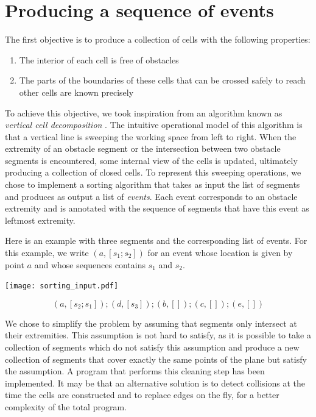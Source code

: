 \documentclass{easychair}
\begin{document}
\section{Producing a sequence of events}
The first objective is to produce a collection of cells with the following
properties:
\begin{enumerate}
\item The interior of each cell is free of obstacles
\item The parts of the boundaries of these cells that can be crossed
  safely to reach other cells are known precisely
\end{enumerate}
To achieve this objective, we took inspiration from an algorithm known as
{\em vertical cell decomposition} \cite{Latombe91}.  The intuitive
operational model of this algorithm is that a vertical line is
sweeping the working space from left to right.  When the extremity of
an obstacle segment or the intersection between two obstacle segments
is encountered, some internal view of the cells is updated, ultimately
producing a collection of closed cells.  To represent this sweeping
operations, we chose to implement a sorting algorithm that takes as
input the list of segments and produces as output a list of {\em
  events}.  Each event corresponds to an obstacle extremity and is
annotated with the sequence of segments that have this event as
leftmost extremity.

Here is an example with three segments and the corresponding list of events.
For this example, we write \((a, [s_1;s_2])\) for an event whose location is
given by point \(a\) and whose sequences contains \(s_1\) and \(s_2\).

\begin{center}
\texttt{[image: sorting\_input.pdf]}
\end{center}
\[ (a, [s_2; s_1]); (d, [s_3]); (b, []); (c, []); (e,[])\]

We chose to simplify the problem by assuming that segments only
intersect at their extremities.  This assumption is not hard to
satisfy, as it is possible to take a collection of segments which do
not satisfy this assumption and produce a new collection of segments
that cover exactly the same points of the plane but satisfy the
assumption.  A program that performs this cleaning step has been
implemented.  It may be that an alternative solution is to detect
collisions at the time the cells are constructed and to replace edges
on the fly, for a better complexity of the total program.
\end{document}
